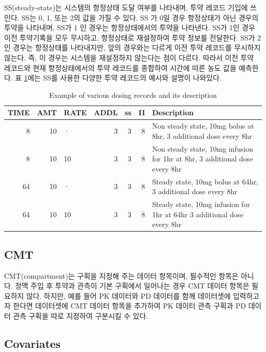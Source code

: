 \documentclass[
  11pt,
  krantz2, a4paper, twoside]{krantz}
\theoremstyle{definition}
\theoremstyle{definition}
\theoremstyle{definition}
\theoremstyle{remark}
\begin{document}

SS(steady-state)는 시스템의 항정상태 도달 여부를 나타내며, 투약 레코드 기입에 쓰인다. SS는 0, 1, 또는 2의 값을 가질 수 있다. SS 가 0일 경우 항정상태가 아닌 경우의 투약을 나타내며, SS가 1 인 경우는 항정상태에서의 투약을 나타낸다. SS가 1인 경우 이전 투약기록을 모두 무시하고, 항정상태로 재설정하여 투약 정보를 전달한다. SS가 2인 경우는 항정상태를 나타내지만, 앞의 경우와는 다르게 이전 투약 레코드를 무시하지 않는다. 즉, 이 경우는 시스템을 재설정하지 않는다는 점이 다르다. 따라서 이전 투약 레코드와 현재 항정상태에서의 투약 레코드를 종합하여 시간에 따른 농도 값을 예측한다. 표 \ref{tab:dosing-rec}에는 SS를 사용한 다양한 투약 레코드의 예시와 설명이 나와있다.

\begin{table}

\caption{\label{tab:dosing-rec}Example of various dosing records and its description}
\centering
\begin{tabular}[t]{rrlrrr>{\raggedright\arraybackslash}p{6cm}}
\toprule
TIME & AMT & RATE & ADDL & ss & II & Description\\
\midrule
8 & 10 & · & 3 & 3 & 8 & Non steady state, 10mg bolus at 8hr, 3 additional dose every 8hr\\
8 & 10 & 10 & 3 & 3 & 8 & Non steady state, 10mg infusion for 1hr at 8hr, 3 additional dose every 8hr\\
64 & 10 & · & 3 & 3 & 8 & Steady state, 10mg bolus at 64hr, 3 additional dose every 8hr\\
64 & 10 & 10 & 3 & 3 & 8 & Steady state, 10mg infusion for 1hr at 64hr 3 additional dose every 8hr\\
\bottomrule
\end{tabular}
\end{table}

\hypertarget{cmt}{%
\subsection{CMT}\label{cmt}}


CMT(compartment)는 구획을 지정해 주는 데이터 항목이며, 필수적인 항목은 아니다. 정맥 주입 후 투약과 관측이 기본 구획에서 일어나는 경우 CMT 데이터 항목은 필요하지 않다. 하지만, 예를 들어 PK 데이터와 PD 데이터를 함께 데이터셋에 입력하고자 한다면 데이터셋에 CMT 데이터 항목을 추가하여 PK 데이터 관측 구획과 PD 데이터 관측 구획을 따로 지정하여 구분시킬 수 있다.

\hypertarget{covariates}{%
\subsection{Covariates}\label{covariates}}
\end{document}
